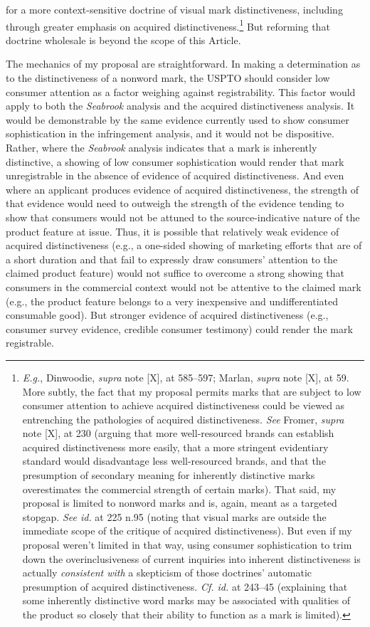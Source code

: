 \documentclass[letterpaper, 11pt, oneside]{article}
\begin{document}
for a more context-sensitive doctrine of visual mark distinctiveness, including through greater emphasis on acquired distinctiveness.\footnote{\textit{E.g.}, Dinwoodie, \textit{supra} note [X], at 585–597; Marlan, \textit{supra} note [X], at 59. More subtly, the fact that my proposal permits marks that are subject to low consumer attention to achieve acquired distinctiveness could be viewed as entrenching the pathologies of acquired distinctiveness. \textit{See} Fromer, \textit{supra} note [X], at 230 (arguing that more well-resourced brands can establish acquired distinctiveness more easily, that a more stringent evidentiary standard would disadvantage less well-resourced brands, and that the presumption of secondary meaning for inherently distinctive marks overestimates the commercial strength of certain marks). That said, my proposal is limited to nonword marks and is, again, meant as a targeted stopgap. \textit{See id.} at 225 n.95 (noting that visual marks are outside the immediate scope of the critique of acquired distinctiveness). But even if my proposal weren't limited in that way, using consumer sophistication to trim down the overinclusiveness of current inquiries into inherent distinctiveness is actually \textit{consistent with} a skepticism of those doctrines' automatic presumption of acquired distinctiveness. \textit{Cf. id.} at 243–45 (explaining that some inherently distinctive word marks may be associated with qualities of the product so closely that their ability to function as a mark is limited).} But reforming that doctrine wholesale is beyond the scope of this Article.

The mechanics of my proposal are straightforward. In making a determination as to the distinctiveness of a nonword mark, the USPTO should consider low consumer attention as a factor weighing against registrability. This factor would apply to both the \textit{Seabrook} analysis and the acquired distinctiveness analysis. It would be demonstrable by the same evidence currently used to show consumer sophistication in the infringement analysis, and it would not be dispositive. Rather, where the \textit{Seabrook} analysis indicates that a mark is inherently distinctive, a showing of low consumer sophistication would render that mark unregistrable in the absence of evidence of acquired distinctiveness. And even where an applicant produces evidence of acquired distinctiveness, the strength of that evidence would need to outweigh the strength of the evidence tending to show that consumers would not be attuned to the source-indicative nature of the product feature at issue. Thus, it is possible that relatively weak evidence of acquired distinctiveness (e.g., a one-sided showing of marketing efforts that are of a short duration and that fail to expressly draw consumers' attention to the claimed product feature) would not suffice to overcome a strong showing that consumers in the commercial context would not be attentive to the claimed mark (e.g., the product feature belongs to a very inexpensive and undifferentiated consumable good). But stronger evidence of acquired distinctiveness (e.g., consumer survey evidence, credible consumer testimony) could render the mark registrable.
\end{document}
